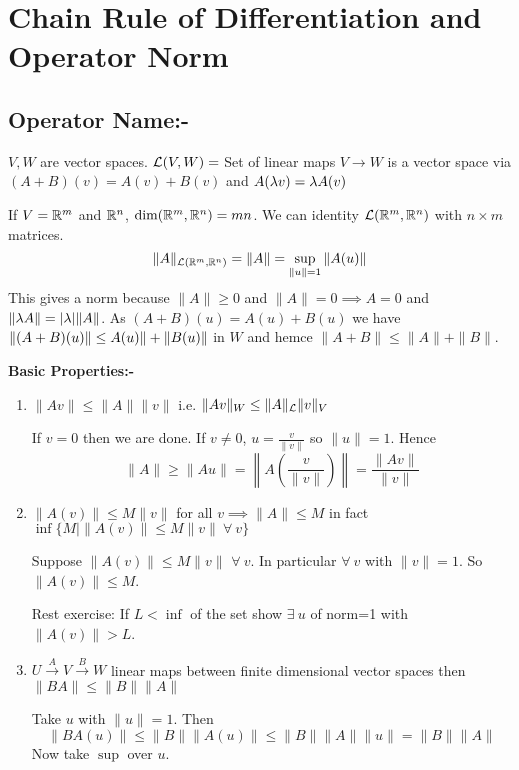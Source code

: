 \chapter{Chain Rule of Differentiation and Operator Norm}
\section{Operator Name:-}
$V,W$ are vector spaces. $\mathcal{L}(V,W)=$ Set of linear maps $V\to W$ is a vector space via $(A+B)(v)=A(v)+B(v)$ and $A(\lambda v)=\lambda A(v)$

If $V=\mathbb{R}^m$ and $\mathbb{R}^n$, $\dim (\mathbb{R}^m,\mathbb{R}^n)=mn$. We can identity $\mathcal{L}(\mathbb{R}^m,\mathbb{R}^n)$ with $n\times m$ matrices. $$\|A\|_{\mathcal{L}(\mathbb{R}^m,\mathbb{R}^n)}=\|A\|=\sup\limits_{\|u\|=1} \|A(u)\|$$This gives a norm because $\|A\|\geq 0$ and $\|A\|=0\implies A=0$ and  $\|\lambda A\|=|\lambda|\|A\|$. As  $(A+B)(u)=A(u)+B(u)$ we have $\|(A+B)(u)\|\leq \\A(u)\|+\|B(u)\|$ in $W$ and hemce $\|A+B\|\leq \|A\|+\|B\|$.

\textbf{Basic Properties:-}
\begin{enumerate}
	\item $\|Av\|\leq \|A\| \|v\|$ i.e. $\|Av\|_W\leq \|A\|_{\mathcal{L}}\|v\|_V$
	      \begin{myproof}
		      If $v=0$ then we are done. If $v\neq 0$, $u=\frac{v}{\|v\|}$ so $\|u\|=1$. Hence $$\|A\|\geq \|Au\|=\left\|A\left(\frac{v}{\|v\|}\right)\right\|=\frac{\|Av\|}{\|v\|}$$
	      \end{myproof}
	\item $\|A(v)\|\leq M\|v\|$ for all $v\implies \|A\|\leq M$ in fact $\inf\{M\mid \|A(v)\|\leq M\|v\|\ \forall\ v\}$
	      \begin{myproof}
		      Suppose $\|A(v)\|\leq M\|v\|$ $\forall\ v$. In particular $\forall\ v$ with $\|v\|=1$. So $\|A(v)\|\leq M$.

		      Rest exercise: If $L<\inf$ of the set  show $\exists \ u$ of norm=1 with $\|A(v)\| >L$.
	      \end{myproof}
	\item $U\xrightarrow{A}V\xrightarrow{B}W$ linear maps between finite dimensional vector spaces  then $\|BA\|\leq \|B\|\|A\|$
	      \begin{myproof}
		      Take $u$ with $\|u\|=1$. Then $$\|BA(u)\|\leq \|B\|\|A(u)\|\leq \|B\|\|A\|\|u\|=\|B\|\|A\|$$Now take $\sup$ over $u$.
	      \end{myproof}
\end{enumerate}

